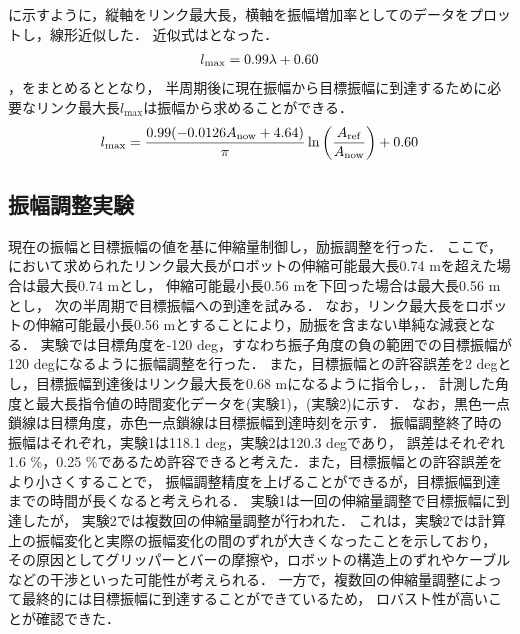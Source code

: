           \figref{}に示すように，縦軸をリンク最大長，横軸を振幅増加率としてのデータをプロットし，線形近似した．
          近似式はとなった．
          \begin{eqnarray}
            \equlabel{length relation}
            l_{\mathrm{max}}=0.99\lambda+0.60
          \end{eqnarray}
          ，をまとめるととなり，
          半周期後に現在振幅から目標振幅に到達するために必要なリンク最大長$l_{\mathrm{max}}$は振幅から求めることができる．
          \begin{eqnarray}
            \equlabel{l status}
            l_{\mathrm{max}}=\frac{0.99(-0.0126A_{\mathrm{now}}+4.64)}{\pi}\ln{\left(\frac{A_{\mathrm{ref}}}{A_{\mathrm{now}}}\right)}+0.60
          \end{eqnarray}
          
        \subsection{振幅調整実験}
        
        現在の振幅と目標振幅の値を基に伸縮量制御し，励振調整を行った．
        ここで，において求められたリンク最大長がロボットの伸縮可能最大長0.74 mを超えた場合は最大長0.74 mとし，
        伸縮可能最小長0.56 mを下回った場合は最大長0.56 mとし，
        次の半周期で目標振幅への到達を試みる．
        なお，リンク最大長をロボットの伸縮可能最小長0.56 mとすることにより，励振を含まない単純な減衰となる．
        実験では目標角度を-120 deg，すなわち振子角度の負の範囲での目標振幅が120 degになるように振幅調整を行った．
        また，目標振幅との許容誤差を2 degとし，目標振幅到達後はリンク最大長を0.68 mになるように指令し，．
        計測した角度と最大長指令値の時間変化データを(実験1)，(実験2)に示す．
        なお，黒色一点鎖線は目標角度，赤色一点鎖線は目標振幅到達時刻を示す．
        振幅調整終了時の振幅はそれぞれ，実験1は118.1 deg，実験2は120.3 degであり，
        誤差はそれぞれ1.6 $\%$，0.25 $\%$であるため許容できると考えた．また，目標振幅との許容誤差をより小さくすることで，
        振幅調整精度を上げることができるが，目標振幅到達までの時間が長くなると考えられる．
        実験1は一回の伸縮量調整で目標振幅に到達したが，
        実験2では複数回の伸縮量調整が行われた．
        これは，実験2では計算上の振幅変化と実際の振幅変化の間のずれが大きくなったことを示しており，
        その原因としてグリッパーとバーの摩擦や，ロボットの構造上のずれやケーブルなどの干渉といった可能性が考えられる．
        一方で，複数回の伸縮量調整によって最終的には目標振幅に到達することができているため，
        ロバスト性が高いことが確認できた．
        





          


